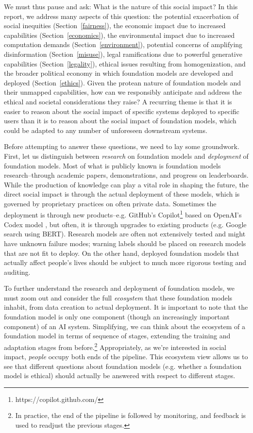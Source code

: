 We must thus pause and ask: What is the nature of this social impact? In this report, we address many aspects of this question: the potential exacerbation of social inequities (Section~\ref{fairness}),
the economic impact due to increased capabilities (Section~\ref{economics}),
the environmental impact due to increased computation demands (Section~\ref{environment}),
potential concerns of amplifying disinformation (Section~\ref{misuse}),
legal ramifications due to powerful generative capabilities (Section~\ref{legality}),
ethical issues resulting from homogenization, and the broader political economy in which foundation models are developed and deployed (Section~\ref{ethics}).
Given the protean nature of foundation models and their unmapped capabilities, how can we responsibly anticipate and address the ethical and societal considerations they raise? A recurring theme is that it is easier to reason about the social impact of specific systems deployed to specific users than it is to reason about the social impact of foundation models, which could be adapted to any number of unforeseen downstream systems.

Before attempting to answer these questions, we need to lay some groundwork. First, let us distinguish between \emph{research} on foundation models and \emph{deployment} of foundation models. Most of what is publicly known is foundation models research--through academic papers, demonstrations, and progress on leaderboards. While the production of knowledge can play a vital role in shaping the future, the direct social impact is through the actual deployment of these models, which is governed by proprietary practices on often private data. Sometimes the deployment is through new products--e.g. GitHub's
Copilot\footnote{https://copilot.github.com/} based on OpenAI's Codex model \citep{chen2021evaluating}, but often, it is through upgrades to existing products (e.g. Google search using BERT). Research models are often not extensively tested and might have unknown failure modes; warning labels should be placed on research models that are not fit to deploy. On the other hand, deployed foundation models that actually affect people's lives should be subject to much more rigorous testing and auditing.

To further understand the research and deployment of foundation models, we must zoom out and consider the full \emph{ecosystem} that these foundation models inhabit, from data creation to actual deployment. It is important to note that the foundation model is only one component (though an increasingly important component) of an AI system. Simplifying, we can think about the ecosystem of a foundation model in terms of sequence of stages, extending the training and adaptation stages from before.\footnote{In practice, the end of the pipeline is followed by monitoring, and feedback is used to readjust the previous stages.} Appropriately, as we're interested in social impact,
\emph{people} occupy both ends of the pipeline. This ecosystem view allows us to see that different questions about foundation models (e.g. whether a foundation model is ethical) should actually be answered with respect to different stages.

